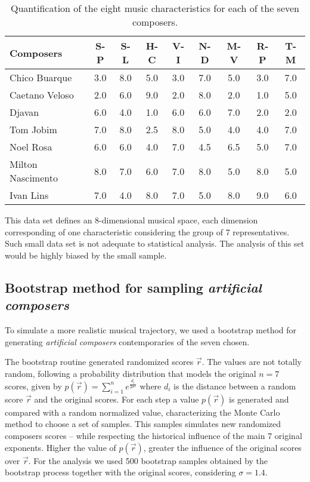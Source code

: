 \documentclass[
 aip,
 jmp,
 amsmath,amssymb,
 reprint,
]{revtex4-1}
\begin{document}
\begin{table}[ht]
\caption{\label{tab:tableA}Quantification of the
eight music characteristics for each of the seven composers.}

\begin{ruledtabular}
\begin{tabular}{|l||c|c|c|c|c|c|c|c|}

 Composers    & S-P & S-L & H-C & V-I & N-D & M-V & R-P & T-M  \\
\hline
 Chico Buarque & 3.0 & 8.0 & 5.0 & 3.0 & 7.0 & 5.0 & 3.0 & 7.0  \\
 Caetano Veloso & 2.0 & 6.0 & 9.0 & 2.0 & 8.0 & 2.0 & 1.0 & 5.0  \\
 Djavan       & 6.0 & 4.0 & 1.0 & 6.0 & 6.0 & 7.0 & 2.0 & 2.0  \\
 Tom Jobim & 7.0 & 8.0 & 2.5 & 8.0 & 5.0 & 4.0 & 4.0 & 7.0  \\
 Noel Rosa & 6.0 & 6.0 & 4.0 & 7.0 & 4.5 & 6.5 & 5.0 & 7.0  \\
 Milton Nascimento & 8.0 & 7.0 & 6.0 & 7.0 & 8.0 & 5.0 & 8.0 & 5.0  \\
 Ivan Lins & 7.0 & 4.0 & 8.0 & 7.0 & 5.0 & 8.0 & 9.0 & 6.0  \\

\end{tabular}
\end{ruledtabular}
\end{table}

This data set defines an 8-dimensional musical space, each dimension
corresponding of one characteristic considering the group of 7 representatives. 
Such small data set is not adequate to statistical analysis. The analysis of this set would
be highly biased by the small sample.

\subsection{Bootstrap method for sampling \emph{artificial composers}}

To simulate a more realistic musical trajectory, we used a bootstrap
method for generating \emph{artificial composers} contemporaries of the seven chosen.

The bootstrap routine generated randomized scores $\vec{r}$. The
values are not totally random, following a probability distribution
that models the original $n = 7$ scores, given by 
$p(\vec{r}) = \sum^n_{i=1} e^{\frac{d_i}{2\sigma^2}}$
where $d_i$ is the distance between a random score $\vec{r}$
and the original scores. For each step a
value $p(\vec{r})$ is generated and compared with a random normalized value,
characterizing the Monte Carlo~\cite{Robert2011} method to choose a set of samples. This
samples simulates new randomized composers scores -- while respecting the
historical influence of the main 7 original exponents. Higher the
value of $p(\vec{r})$, greater the influence of the original scores
over $\vec{r}$. For the analysis
we used 500 bootstrap samples obtained by the bootstrap process
together with the original scores,
considering $\sigma = 1.4$.
\end{document}
